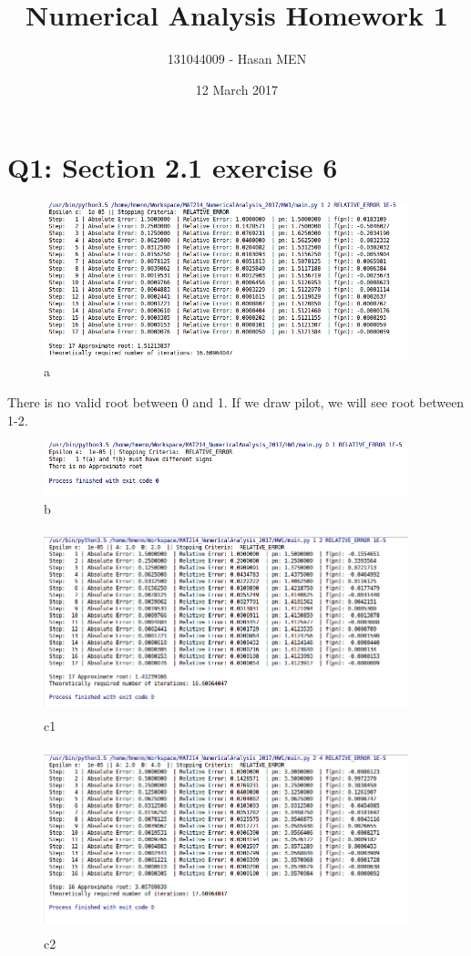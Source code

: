 \documentclass{article}
\title{Numerical Analysis Homework 1}
\author{131044009 - Hasan MEN}
\date{12 March 2017}
\begin{document}
\maketitle

\section{Q1: Section 2.1 exercise 6}

\begin{figure}[h]
       \includegraphics[width=400px]{ss_2_2_6_a.png}
       \caption{a}
\end{figure}
There is no valid root between 0 and 1. If we draw pilot, we will see root between 1-2.
\begin{figure}[h]
       \includegraphics[width=400px]{ss_2_2_6_b.png}
       \caption{b}
\end{figure}
\begin{figure}[h]
       \includegraphics[width=400px,height=200px]{ss_2_2_6_c_1.png}
       \caption{c1}
\end{figure}
\begin{figure}[h]
       \includegraphics[width=400px,height=200px]{ss_2_2_6_c_2.png}
       \caption{c2}
\end{figure}
\end{document}
